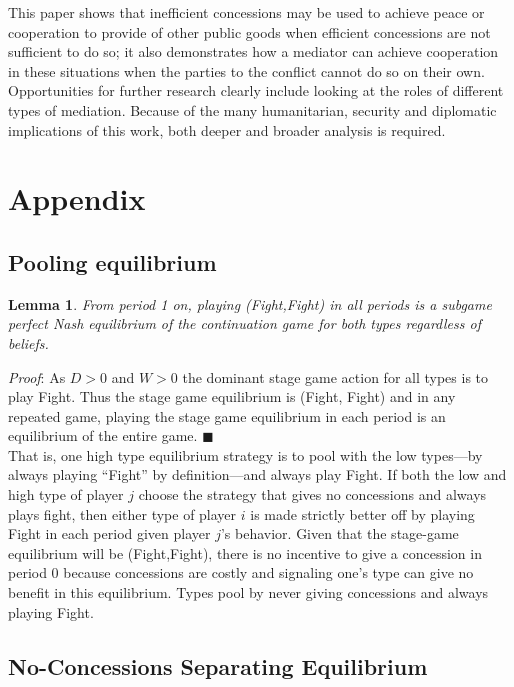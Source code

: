 \documentclass[12pt, letterpaper]{article}
\newtheorem{lemma}{Lemma}
\begin{document}
This paper shows that inefficient concessions may be used to achieve peace or cooperation to provide of other public goods when efficient concessions are not sufficient to do so; it also demonstrates how a mediator can achieve cooperation in these situations when the parties to the conflict cannot do so on their own. Opportunities for further research clearly include looking at the roles of different types of mediation. Because of the many humanitarian, security and diplomatic implications of this work, both deeper and broader analysis is required.

\section{Appendix}


\subsection{Pooling equilibrium}
\begin{lemma}
	From period 1 on, playing (Fight,Fight) in all periods is a subgame perfect Nash equilibrium of the continuation game for both types regardless of beliefs.
	\label{lemma:1}
\end{lemma}
\emph{Proof}: As $D>0$ and $W>0$ the dominant stage game action for all types is to play Fight. Thus the stage game equilibrium is (Fight, Fight) and in any repeated game, playing the stage game equilibrium in each period is an equilibrium of the entire game. \hfill $\blacksquare$\\

That is, one high type equilibrium strategy is to pool with the low types---by always playing ``Fight'' by definition---and always play Fight. If both the low and high type of player $j$ choose the strategy that gives no concessions and always plays fight, then either type of player $i$ is made strictly better off by playing Fight in each period given player $j$'s behavior. Given that the stage-game equilibrium will be (Fight,Fight), there is no incentive to give a concession in period 0 because concessions are costly and signaling one's type can give no benefit in this equilibrium. Types pool by never giving concessions and always playing Fight. 
 
\subsection{No-Concessions Separating Equilibrium}
 
\end{document}

